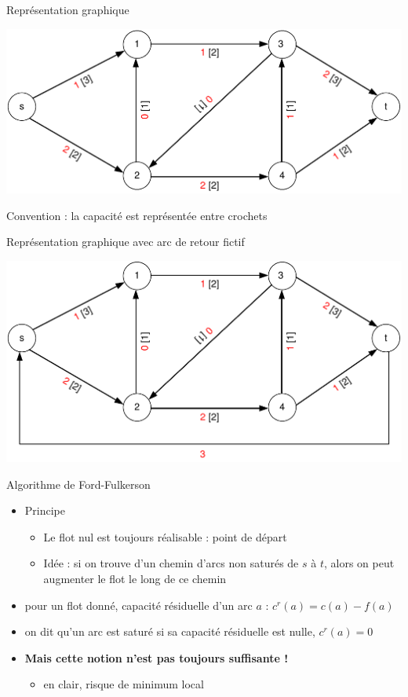 \begin{frame}{Représentation graphique}
    \begin{center}
        \includegraphics[height=.5\textheight]{fig/flot1.pdf}
    \end{center}
    Convention : la capacité est représentée entre crochets 
\end{frame}

\begin{frame}{Représentation graphique avec arc de retour fictif}
    \begin{center}
        \includegraphics[height=.5\textheight]{fig/flot2.pdf}
    \end{center}
\end{frame}

\begin{frame}{Algorithme de Ford-Fulkerson}
    \begin{itemize}
        \item Principe 
        \begin{itemize}
            \item Le flot nul est toujours réalisable : point de départ
            \item Idée : si on trouve d'un chemin d'arcs non saturés de $s$ à $t$, alors on peut augmenter le flot le long de ce chemin 
        \end{itemize}
        \item pour un flot donné, capacité résiduelle d'un arc $a$ : $c^r(a) = c(a) - f(a)$
        \item on dit qu'un arc est saturé si sa capacité résiduelle est nulle, $c^r(a) = 0$
        \item \textbf{Mais cette notion n'est pas toujours suffisante !}
        \begin{itemize}
            \item en clair, risque de minimum local 
        \end{itemize}
    \end{itemize}
\end{frame}

